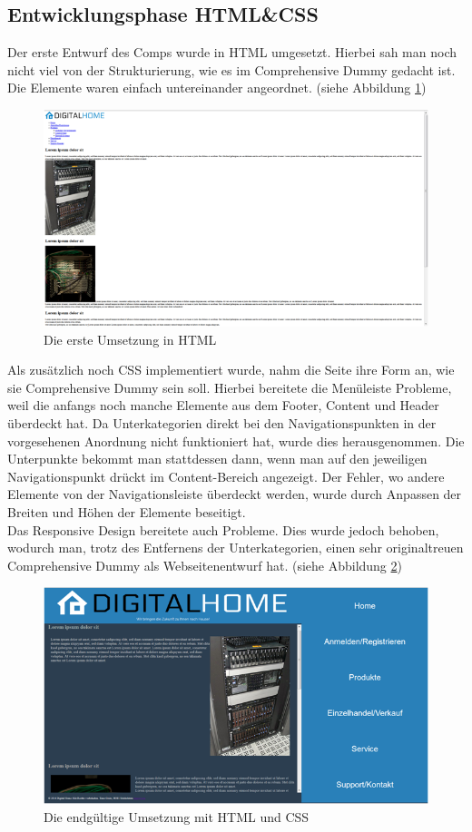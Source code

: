 	\subsection{Entwicklungsphase HTML\&CSS}
Der erste Entwurf des Comps wurde in HTML umgesetzt. Hierbei sah man noch nicht viel von der Strukturierung, wie es im Comprehensive Dummy gedacht ist. Die Elemente waren einfach untereinander angeordnet. (siehe Abbildung  \ref{mini_comp2})
\\
\begin{figure} [hp]
\includegraphics[width=\textwidth]{./img/mini_comp2.png}
\caption{Die erste Umsetzung in HTML}
\label{mini_comp2}
\end{figure}
Als zusätzlich noch CSS implementiert wurde, nahm die Seite ihre Form an, wie sie Comprehensive Dummy sein soll. Hierbei bereitete die Menüleiste Probleme, weil die anfangs noch manche Elemente aus dem Footer, Content und Header überdeckt hat. Da Unterkategorien direkt bei den Navigationspunkten in der vorgesehenen Anordnung nicht funktioniert hat, wurde dies herausgenommen. Die Unterpunkte bekommt man stattdessen dann, wenn man auf den jeweiligen Navigationspunkt drückt im Content-Bereich angezeigt. Der Fehler, wo andere Elemente von der Navigationsleiste überdeckt werden, wurde durch Anpassen der Breiten und Höhen der Elemente beseitigt.
\\
Das Responsive Design bereitete auch Probleme. Dies wurde jedoch behoben, wodurch man, trotz des Entfernens der Unterkategorien, einen sehr originaltreuen Comprehensive Dummy als Webseitenentwurf hat. (siehe Abbildung  \ref{mini_comp3})
\begin{figure} [hp]
\includegraphics[width=\textwidth]{./img/mini_comp3.png}
\caption{Die endgültige Umsetzung mit HTML und CSS}
\label{mini_comp3}
\end{figure}

